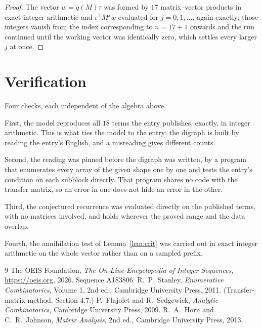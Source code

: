 \documentclass[11pt,a4paper]{article}
\theoremstyle{plain}
\theoremstyle{definition}
\begin{document}
\begin{proof}
The vector $w=q(M)\tau$ was formed by $17$ matrix--vector products in exact integer
arithmetic and $\iota^{\!\top}M^{j}w$ evaluated for $j=0,1,\dots$, again exactly; those
integers vanish from the index corresponding to $n=17+1$ onwards and the run continued
until the working vector was identically zero, which settles every larger $j$ at once.
\end{proof}

\section{Verification}

Four checks, each independent of the algebra above.

First, the model reproduces all $18$ terms the entry publishes, exactly, in integer
arithmetic. This is what ties the model to the entry: the digraph is built by reading the
entry's English, and a misreading gives different counts.

Second, the reading was pinned before the digraph was written, by a program that enumerates
every array of the given shape one by one and tests the entry's condition on each subblock
directly. That program shares no code with the transfer matrix, so an error in one does not
hide an error in the other.

Third, the conjectured recurrence was evaluated directly on the published terms, with no
matrices involved, and holds wherever the proved range and the data overlap.

Fourth, the annihilation test of Lemma~\ref{lem:crit} was carried out in exact integer
arithmetic on the whole vector rather than on a sampled prefix.

\begin{thebibliography}{9}
 The OEIS Foundation, \emph{The On-Line Encyclopedia of Integer
Sequences}, \url{https://oeis.org}, 2026. Sequence A183806.
 R.~P.~Stanley, \emph{Enumerative Combinatorics}, Volume 1, 2nd ed.,
Cambridge University Press, 2011. (Transfer-matrix method, Section 4.7.)
 P.~Flajolet and R.~Sedgewick, \emph{Analytic Combinatorics}, Cambridge
University Press, 2009.
 R.~A.~Horn and C.~R.~Johnson, \emph{Matrix Analysis}, 2nd ed., Cambridge
University Press, 2013.
\end{thebibliography}
\end{document}
